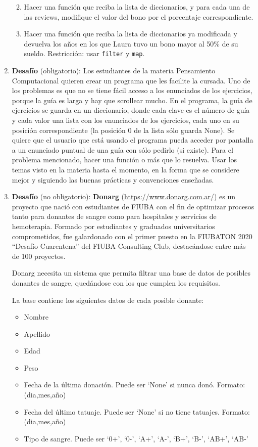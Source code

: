 \documentclass[
  letterpaper,
  DIV=11,
  numbers=noendperiod]{scrreprt}
\providecommand{\tightlist}{%
  \setlength{\itemsep}{0pt}\setlength{\parskip}{0pt}}\usepackage{longtable,booktabs,array}
\begin{document}
\begin{enumerate}
  \begin{enumerate}
  \def\labelenumii{\alph{enumii}.}
  \item
    Hacer una función que reciba la lista de diccionarios, y para cada
    una de las reviews, modifique el valor del bono por el porcentaje
    correspondiente.
  \item
    Hacer una función que reciba la lista de diccionarios ya modificada
    y devuelva los años en los que Laura tuvo un bono mayor al 50\% de
    su sueldo. Restricción: usar \texttt{filter} y \texttt{map}.
  \end{enumerate}
\item
  \textbf{Desafío} (obligatorio): Los estudiantes de la materia
  Pensamiento Computacional quieren crear un programa que les facilite
  la cursada. Uno de los problemas es que no se tiene fácil acceso a los
  enunciados de los ejercicios, porque la guía es larga y hay que
  scrollear mucho. En el programa, la guía de ejercicios se guarda en un
  diccionario, donde cada clave es el número de guía y cada valor una
  lista con los enunciados de los ejercicios, cada uno en su posición
  correspondiente (la posición 0 de la lista sólo guarda None). Se
  quiere que el usuario que está usando el programa pueda acceder por
  pantalla a un enunciado puntual de una guía con sólo pedirlo (si
  existe). Para el problema mencionado, hacer una función o más que lo
  resuelva. Usar los temas visto en la materia hasta el momento, en la
  forma que se considere mejor y siguiendo las buenas prácticas y
  convenciones enseñadas.
\item
  \textbf{Desafío} (no obligatorio): \textbf{Donarg}
  (\url{https://www.donarg.com.ar/}) es un proyecto que nació con
  estudiantes de FIUBA con el fin de optimizar procesos tanto para
  donantes de sangre como para hospitales y servicios de hemoterapia.
  Formado por estudiantes y graduados universitarios comprometidos, fue
  galardonado con el primer puesto en la FIUBATON 2020 ``Desafío
  Cuarentena'' del FIUBA Consulting Club, destacándose entre más de 100
  proyectos.

  Donarg necesita un sistema que permita filtrar una base de datos de
  posibles donantes de sangre, quedándose con los que cumplen los
  requisitos.

  La base contiene los siguientes datos de cada posible donante:

  \begin{itemize}
  \tightlist
  \item
    Nombre
  \item
    Apellido
  \item
    Edad
  \item
    Peso
  \item
    Fecha de la última donación. Puede ser `None' si nunca donó.
    Formato: (dia,mes,año)
  \item
    Fecha del último tatuaje. Puede ser `None' si no tiene tatuajes.
    Formato: (dia,mes,año)
  \item
    Tipo de sangre. Puede ser `0+', `0-', `A+', `A-', `B+', `B-', `AB+',
    `AB-'
  \end{itemize}


\end{enumerate}
\end{document}
